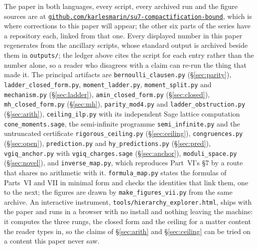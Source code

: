 \documentclass[11pt,a4paper]{article}
\begin{document}
\begingroup
The paper in both languages, every script, every archived run and the figure sources are at
\href{https://github.com/karlesmarin/su7-compactification-bound}{\texttt{github.com/karlesmarin/su7-compactification-bound}},
which is where corrections to this paper will appear; the other six parts of the series have a
repository each, linked from that one.
Every displayed number in this paper regenerates from the ancillary scripts, whose standard output is
archived beside them in \texttt{outputs/}; the ledger above cites the script for each entry rather
than the number alone, so a reader who disagrees with a claim can re-run the thing that made it.
The principal artifacts are
\texttt{bernoulli\_\allowbreak clausen.py} (\S\ref{sec:parity}),
\texttt{ladder\_\allowbreak closed\_\allowbreak form.py}, \texttt{moment\_\allowbreak ladder.py},
\texttt{moment\_\allowbreak split.py} and \texttt{mechanism.py} (\S\ref{sec:ladder}),
\texttt{amin\_\allowbreak closed\_\allowbreak form.py} (\S\ref{sec:closed}),
\texttt{mh\_\allowbreak closed\_\allowbreak form.py} (\S\ref{sec:mh}),
\texttt{parity\_\allowbreak mod4.py} and \texttt{ladder\_\allowbreak obstruction.py} (\S\ref{sec:arith}),
\texttt{ceiling\_\allowbreak ilp.py} with its independent Sage lattice computation
\texttt{cone\_\allowbreak moments.sage}, the semi-infinite programme
\texttt{semi\_\allowbreak infinite.py} and the untruncated certificate
\texttt{rigorous\_\allowbreak ceiling.py} (\S\ref{sec:ceiling}),
\texttt{congruences.py} (\S\ref{sec:open}),
\texttt{prediction.py} and \texttt{hy\_\allowbreak predictions.py} (\S\ref{sec:pred}),
\texttt{vgiq\_\allowbreak anchor.py} with \texttt{vgiq\_\allowbreak charges.sage} (\S\ref{sec:anchor}),
\texttt{moduli\_\allowbreak space.py} (\S\ref{sec:novel}),
and \texttt{inverse\_\allowbreak map.py}, which reproduces Part~VI's \S7 by a route that shares no
arithmetic with it.
\texttt{formula\_\allowbreak map.py} states the formulas of Parts~VI and VII in minimal form and
checks the identities that link them, one to the next; the figures are drawn by
\texttt{make\_\allowbreak figures\_\allowbreak vii.py} from the same archive.
An interactive instrument, \texttt{tools/hierarchy\_\allowbreak explorer.html}, ships with the paper
and runs in a browser with no install and nothing leaving the machine: it computes the three rungs,
the closed form and the ceiling for a matter content the reader types in, so the claims of
\S\ref{sec:arith} and \S\ref{sec:ceiling} can be tried on a content this paper never saw.
\end{document}
